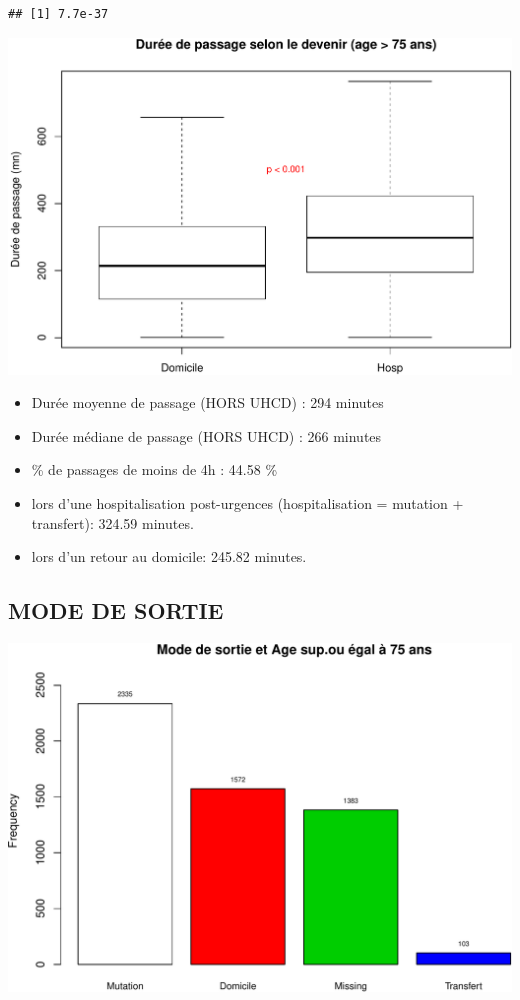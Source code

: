 \documentclass[]{article}
\begin{document}
\begin{verbatim}
## [1] 7.7e-37
\end{verbatim}

\includegraphics{rapport_2014_files/figure-latex/duree_passage_75-1.pdf}

\begin{itemize}
\itemsep1pt\parskip0pt
\item
  Durée moyenne de passage (HORS UHCD) : 294 minutes
\item
  Durée médiane de passage (HORS UHCD) : 266 minutes
\item
  \% de passages de moins de 4h : 44.58 \%
\item
  lors d'une hospitalisation post-urgences (hospitalisation = mutation +
  transfert): 324.59 minutes.
\item
  lors d'un retour au domicile: 245.82 minutes.
\end{itemize}

\subsection{MODE DE SORTIE}\label{mode-de-sortie-1}

\includegraphics{rapport_2014_files/figure-latex/sortie75-1.pdf}
\end{document}

